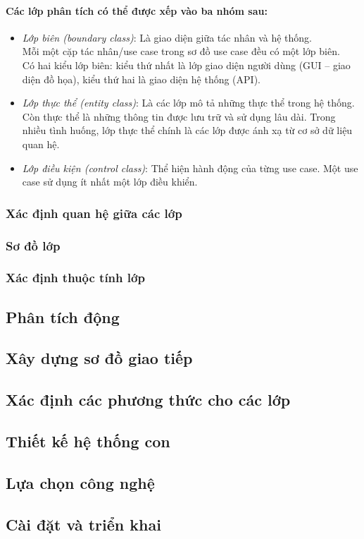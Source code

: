 \documentclass{article}
\begin{document}
      \paragraph{\textnormal{
        Các lớp phân tích có thể được xếp vào ba nhóm sau:
      }}
      \begin{itemize}
        \item \textit{Lớp biên (boundary class)}: Là giao diện giữa tác nhân và hệ thống.\\
        Mỗi một cặp tác nhân/use case trong sơ đồ use case đều có một lớp biên.\\
        Có hai kiểu lớp biên: kiểu thứ nhất là lớp giao diện người dùng (GUI -- giao diện đồ họa), kiểu thứ hai là giao diện hệ thống (API).
        \item \textit{Lớp thực thể (entity class)}: Là các lớp mô tả những thực thể trong hệ thống. Còn thực thể là những thông tin được lưu trữ và sử dụng lâu dài. Trong nhiều tình huống, lớp thực thể chính là các lớp được ánh xạ từ cơ sở dữ liệu quan hệ.
        \item \textit{Lớp điều kiện (control class)}: Thể hiện hành động của từng use case. Một use case sử dụng ít nhất một lớp điều khiển.
      \end{itemize}

    \subsubsection{Xác định quan hệ giữa các lớp}

    \subsubsection{Sơ đồ lớp}

    \subsubsection{Xác định thuộc tính lớp}

  \subsection{Phân tích động}
    \subsection{Xây dựng sơ đồ giao tiếp}

    \subsection{Xác định các phương thức cho các lớp}

  \subsection{Thiết kế hệ thống con}

  \subsection{Lựa chọn công nghệ}

  \subsection{Cài đặt và triển khai}
\end{document}
